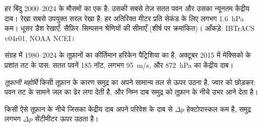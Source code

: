 \begin{omfigure}

{\small हर बिंदु 2000--2024 के मौसमों का एक  है: उसकी
सबसे तेज़ सतत पवन और उसका न्यूनतम केंद्रीय दाब। रेखा सबसे उपयुक्त
सरल रेखा है: हर अतिरिक्त मीटर प्रति सेकंड के लिए लगभग \qty{1.6}{hPa} कम।
धूसर डैश रेखाएँ: सैफ़िर--सिम्पसन श्रेणियों की सीमाएँ (शीर्ष पर
क्रमांकित)। आँकड़े: IBTrACS v04r01, NOAA NCEI।}
\end{omfigure}

संग्रह में 1980--2024 के तूफ़ानों का कीर्तिमान हरिकेन
पैट्रिशिया का है, अक्टूबर 2015 में मेक्सिको के प्रशांत तट के पास: सतत पवनें
185 नॉट, लगभग \qty{95}{m/s}, और \qty{872}{hPa} का केंद्रीय दाब।

\begin{definition}[तूफ़ानी महोर्मि]\label{def:g10:storms-and-cyclones:storm-surge}
\emph{तूफ़ानी महोर्मि} किसी तूफ़ान के कारण समुद्र का अपने
सामान्य तल से ऊपर उठना है, ज्वार को छोड़कर: पवन तट के सामने जल का ढेर लगा
देती है, और निम्न दाब समुद्र को तूफ़ान के नीचे उभर आने देता है।
\end{definition}

\begin{proposition}[दाब-उभार]\label{prop:g10:storms-and-cyclones:bulge}
किसी ऐसे तूफ़ान के नीचे जिसका केंद्रीय दाब अपने परिवेश के दाब से $\Delta p$ हेक्टोपास्कल
कम है, समुद्र लगभग $\Delta p$ सेंटीमीटर ऊपर उठता है।
\end{proposition}

